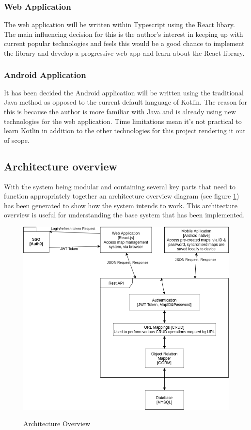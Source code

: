 \subsubsection{Web Application}
The web application will be written within Typescript using the React libary. The main influencing decision for this is the author's interest in keeping up with current popular technologies and feels this would be a good chance to implement the library and develop a progressive web app and learn about the React library.

\subsubsection{Android Application}
It has been decided the Android application will be written using the traditional Java method as opposed to the current default language of Kotlin. The reason for this is because the author is more familiar with Java and is already using new technologies for the web application. Time limitations mean it's not practical to learn Kotlin in addition to the other technologies for this project rendering it out of scope.

\pagebreak
\subsection{Architecture overview}
With the system being modular and containing several key parts that need to function appropriately together an architecture overview diagram (see figure \ref{fig:architectureov}) has been generated to show how the system intends to work. This architecture overview is useful for understanding the base system that has been implemented.
\begin{figure}[h]
	\includegraphics[width=\linewidth]{./images/designs/ArchitectureOverview.png}\\
	\caption{Architecture Overview}
	\label{fig:architectureov}
\end{figure}

